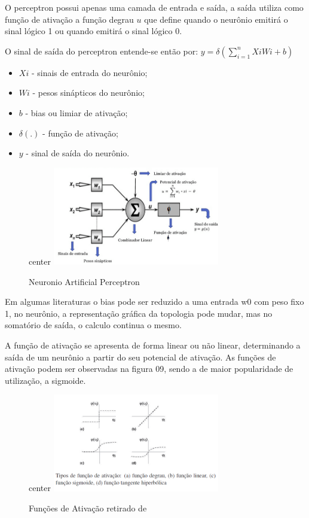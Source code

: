 \documentclass[	12pt, Times, openright, twoside, a4paper, english, brazil]{abntex2}
\begin{document}
            O perceptron \cite{Flavia2014} possui apenas uma camada de entrada e saída, a saída utiliza como função de ativação a função degrau $u$ que define quando o neurônio emitirá o sinal lógico 1 ou quando emitirá o sinal lógico 0.

            O sinal de saída do perceptron entende-se então por:
            $y= \delta(\sum_{i=1}^{n}XiWi+b)$
            \begin{itemize}
            	\item $ Xi $ - sinais de entrada do neurônio;
            	\item $ Wi $ - pesos sinápticos do neurônio;
            	\item $ b $ - bias ou limiar de ativação;
            	\item $ \delta(.) $ - função de ativação;
            	\item $ y $ - sinal de saída do neurônio.
            \end{itemize}
			
            \begin{figure}[!ht]
            	center{
              \includegraphics[width=0.65\textwidth]
              {08-perceptron.png}
            }
            \caption{Neuronio Artificial Perceptron\label{fig:perceptron}}
            \end{figure}
			
			Em algumas literaturas o bias pode ser reduzido a uma entrada w0 com peso fixo 1, no neurônio, a representação gráfica da topologia pode mudar, mas no somatório de saída, o calculo continua o mesmo.
			
			A função de ativação se apresenta de forma linear ou não linear, determinando a saída de um neurônio a partir do seu potencial de ativação. 
			As funções de ativação podem ser observadas na figura 09, sendo a de maior popularidade de utilização, a sigmoide.
			
			\begin{figure}[!ht]
				center{
					\includegraphics[width=0.65\textwidth]
					{09-funcoes-ativacao.png}
				}
				\caption{Funções de Ativação retirado de \cite{Flavia2014} \label{fig:perceptron}}
			\end{figure}
			
\end{document}
